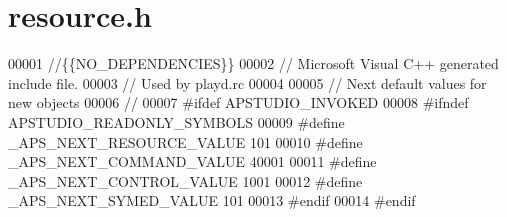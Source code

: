 \hypertarget{resource_8h_source}{\section{resource.\+h}
\label{resource_8h_source}
}

\begin{DoxyCode}
00001 \textcolor{comment}{//\{\{NO\_DEPENDENCIES\}\}}
00002 \textcolor{comment}{// Microsoft Visual C++ generated include file.}
00003 \textcolor{comment}{// Used by playd.rc}
00004 
00005 \textcolor{comment}{// Next default values for new objects}
00006 \textcolor{comment}{//}
00007 \textcolor{preprocessor}{#ifdef APSTUDIO\_INVOKED}
00008 \textcolor{preprocessor}{#ifndef APSTUDIO\_READONLY\_SYMBOLS}
00009 \textcolor{preprocessor}{#define \_APS\_NEXT\_RESOURCE\_VALUE 101}
00010 \textcolor{preprocessor}{#define \_APS\_NEXT\_COMMAND\_VALUE 40001}
00011 \textcolor{preprocessor}{#define \_APS\_NEXT\_CONTROL\_VALUE 1001}
00012 \textcolor{preprocessor}{#define \_APS\_NEXT\_SYMED\_VALUE 101}
00013 \textcolor{preprocessor}{#endif}
00014 \textcolor{preprocessor}{#endif}
\end{DoxyCode}
